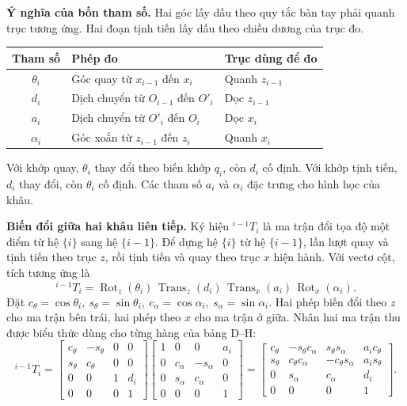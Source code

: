 \noindent\textbf{Ý nghĩa của bốn tham số.}
Hai góc lấy dấu theo quy tắc bàn tay phải quanh trục tương ứng. Hai đoạn tịnh tiến lấy dấu theo chiều dương của trục đo.
\begin{center}
\begin{tabular}{@{}cll@{}}
\toprule
Tham số & Phép đo & Trục dùng để đo\\
\midrule
\(\theta_i\) & Góc quay từ \(x_{i-1}\) đến \(x_i\) & Quanh \(z_{i-1}\)\\
\(d_i\)      & Dịch chuyển từ \(O_{i-1}\) đến \(O'_i\) & Dọc \(z_{i-1}\)\\
\(a_i\)      & Dịch chuyển từ \(O'_i\) đến \(O_i\) & Dọc \(x_i\)\\
\(\alpha_i\) & Góc xoắn từ \(z_{i-1}\) đến \(z_i\) & Quanh \(x_i\)\\
\bottomrule
\end{tabular}
\end{center}
Với khớp quay, \(\theta_i\) thay đổi theo biến khớp \(q_i\), còn \(d_i\) cố định. Với khớp tịnh tiến, \(d_i\) thay đổi, còn \(\theta_i\) cố định. Các tham số \(a_i\) và \(\alpha_i\) đặc trưng cho hình học của khâu.

\noindent\textbf{Biến đổi giữa hai khâu liên tiếp.}
Ký hiệu \({}^{i-1}T_i\) là ma trận đổi tọa độ một điểm từ hệ \(\{i\}\) sang hệ \(\{i-1\}\). Để dựng hệ \(\{i\}\) từ hệ \(\{i-1\}\), lần lượt quay và tịnh tiến theo trục \(z\), rồi tịnh tiến và quay theo trục \(x\) hiện hành. Với vectơ cột, tích tương ứng là
\[
{}^{i-1}T_i=
\operatorname{Rot}_z(\theta_i)\,
\operatorname{Trans}_z(d_i)\,
\operatorname{Trans}_x(a_i)\,
\operatorname{Rot}_x(\alpha_i).
\]
Đặt \(c_\theta=\cos\theta_i,\ s_\theta=\sin\theta_i,\ c_\alpha=\cos\alpha_i,\ s_\alpha=\sin\alpha_i\).
Hai phép biến đổi theo \(z\) cho ma trận bên trái, hai phép theo \(x\) cho ma trận ở giữa. Nhân hai ma trận thu được biểu thức dùng cho từng hàng của bảng D--H:
\[
{}^{i-1}T_i =
\begin{bmatrix}
c_\theta&-s_\theta&0&0\\s_\theta&c_\theta&0&0\\0&0&1&d_i\\0&0&0&1
\end{bmatrix}
\begin{bmatrix}
1&0&0&a_i\\0&c_\alpha&-s_\alpha&0\\0&s_\alpha&c_\alpha&0\\0&0&0&1
\end{bmatrix}
=
\begin{bmatrix}
c_\theta&-s_\theta c_\alpha&s_\theta s_\alpha&a_ic_\theta\\
s_\theta&c_\theta c_\alpha&-c_\theta s_\alpha&a_is_\theta\\
0&s_\alpha&c_\alpha&d_i\\
0&0&0&1
\end{bmatrix}.
\]

